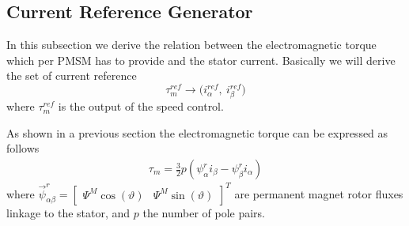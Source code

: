 \documentclass[12pt,a4paper,oneside]{book}
\begin{document}
\begin{onehalfspace}
\subsection{Current Reference Generator}
In this subsection we derive the relation between the electromagnetic torque which per PMSM has to provide and the stator current. Basically we will derive the set of current reference
\begin{equation}\label{pmsm_problem_1_eq_17}
	\tau_m^{ref}\rightarrow \big(i_\alpha^{ref},\ i_\beta^{ref}\big)
\end{equation}
where $\tau_m^{ref}$ is the output of the speed control.

As shown in a previous section the electromagnetic torque can be expressed as 
follows
\begin{equation}\label{pmsm_problem_1_eq_18}
	\begin{aligned}
		\tau_m = \frac{3}{2}p\left( 
		\psi^r_{\alpha}i_{\beta}-\psi^r_{\beta}i_{\alpha}\right) 
	\end{aligned} 
\end{equation}
where $\vec{\psi}^r_{\alpha\beta} = \begin{bmatrix} \Psi^M\cos(\vartheta) &  
	\Psi^M\sin(\vartheta)\end{bmatrix}^T$ are permanent magnet rotor fluxes linkage to the stator, and $p$ the number of pole pairs.


\end{onehalfspace}
\end{document}

